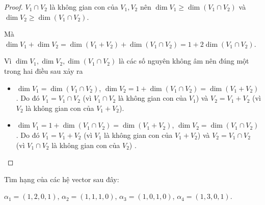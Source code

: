 \begin{proof}
    $V_{1}\cap V_{2}$ là không gian con của $V_{1}, V_{2}$ nên $\dim V_{1} \geq \dim(V_{1}\cap V_{2})$ và $\dim V_{2} \geq \dim(V_{1}\cap V_{2})$.

    Mà $\dim V_{1} + \dim V_{2} = \dim (V_{1} + V_{2}) + \dim(V_{1}\cap V_{2}) = 1 + 2\dim (V_{1}\cap V_{2})$.

    Vì $\dim V_{1}, \dim V_{2}, \dim (V_{1}\cap V_{2})$ là các số nguyên không âm nên đúng một trong hai điều sau xảy ra
    \begin{itemize}
        \item $\dim V_{1} = \dim (V_{1} \cap V_{2})$, $\dim V_{2} = 1 + \dim (V_{1}\cap V_{2}) = \dim(V_{1} + V_{2})$. Do đó $V_{1} = V_{1}\cap V_{2}$ (vì $V_{1}\cap V_{2}$ là không gian con của $V_{1}$) và $V_{2} = V_{1} + V_{2}$ (vì $V_{2}$ là không gian con của $V_{1} + V_{2}$).
        \item $\dim V_{1} = 1 + \dim (V_{1}\cap V_{2}) = \dim(V_{1} + V_{2})$, $\dim V_{2} = \dim (V_{1} \cap V_{2})$. Do đó $V_{1} = V_{1} + V_{2}$ (vì $V_{1}$ là không gian con của $V_{1} + V_{2}$) và $V_{2} = V_{1}\cap V_{2}$ (vì $V_{1}\cap V_{2}$ là không gian con của $V_{2}$) .
    \end{itemize}
\end{proof}

Tìm hạng của các hệ vector sau đây:

\begin{exercise}
    $\alpha_{1} = (1,2,0,1)$, $\alpha_{2} = (1,1,1,0)$, $\alpha_{3} = (1,0,1,0)$, $\alpha_{4} = (1,3,0,1)$.
\end{exercise}

